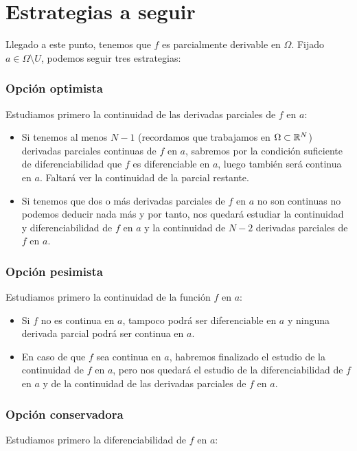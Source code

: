 \section{Estrategias a seguir}
\noindent
Llegado a este punto, tenemos que $f$ es parcialmente derivable en $\Omega$. Fijado $a \in \Omega \setminus U$, podemos seguir tres estrategias:

\subsubsection{Opción optimista}
\noindent
Estudiamos primero la continuidad de las derivadas parciales de $f$ en $a$:

\begin{itemize}
    \item Si tenemos al menos $N-1$ (recordamos que trabajamos en $\Omega \subset \mathbb R^N$) derivadas parciales continuas de $f$ en $a$, sabremos por la condición suficiente de diferenciabilidad que $f$ es diferenciable en $a$, luego también será continua en $a$. Faltará ver la continuidad de la parcial restante.
    \item Si tenemos que dos o más derivadas parciales de $f$ en $a$ no son continuas no podemos deducir nada más y por tanto, nos quedará estudiar la continuidad y diferenciabilidad de $f$ en $a$ y la continuidad de $N-2$ derivadas parciales de $f$ en $a$.
\end{itemize}

\subsubsection{Opción pesimista}
\noindent
Estudiamos primero la continuidad de la función $f$ en $a$:

\begin{itemize}
    \item Si $f$ no es continua en $a$, tampoco podrá ser diferenciable en $a$ y ninguna derivada parcial podrá ser continua en $a$.
    \item En caso de que $f$ sea continua en $a$, habremos finalizado el estudio de la continuidad de $f$ en $a$, pero nos quedará el estudio de la diferenciabilidad de $f$ en $a$ y de la continuidad de las derivadas parciales de $f$ en $a$.
\end{itemize}

\subsubsection{Opción conservadora}
\noindent
Estudiamos primero la diferenciabilidad de $f$ en $a$:

